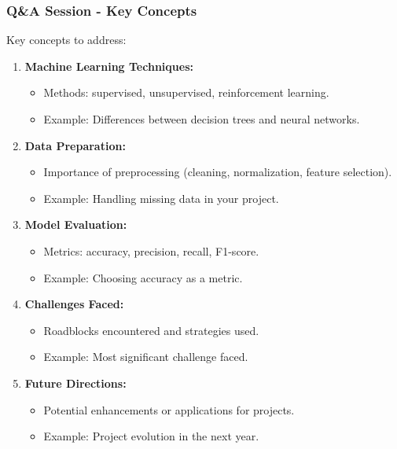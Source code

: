 \documentclass[aspectratio=169]{beamer}
\begin{document}
\begin{frame}[fragile]
  \frametitle{Q\&A Session - Key Concepts}
  Key concepts to address:
  \begin{enumerate}
      \item \textbf{Machine Learning Techniques:}
        \begin{itemize}
          \item Methods: supervised, unsupervised, reinforcement learning.
          \item Example: Differences between decision trees and neural networks.
        \end{itemize}
      \item \textbf{Data Preparation:}
        \begin{itemize}
          \item Importance of preprocessing (cleaning, normalization, feature selection).
          \item Example: Handling missing data in your project.
        \end{itemize}
      \item \textbf{Model Evaluation:}
        \begin{itemize}
          \item Metrics: accuracy, precision, recall, F1-score.
          \item Example: Choosing accuracy as a metric.
        \end{itemize}
      \item \textbf{Challenges Faced:}
        \begin{itemize}
          \item Roadblocks encountered and strategies used.
          \item Example: Most significant challenge faced.
        \end{itemize}
      \item \textbf{Future Directions:}
        \begin{itemize}
          \item Potential enhancements or applications for projects.
          \item Example: Project evolution in the next year.
        \end{itemize}
  \end{enumerate}
\end{frame}
\end{document}
